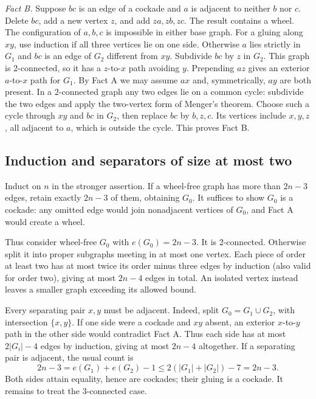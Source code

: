 \emph{Fact B.} Suppose \(bc\) is an edge of a cockade and \(a\) is adjacent to neither \(b\) nor \(c\).
Delete \(bc\), add a new vertex \(z\), and add \(za,zb,zc\). The result contains a wheel.
The configuration of \(a,b,c\) is impossible in either base graph.
For a gluing along \(xy\), use induction if all three vertices lie on one side.
Otherwise \(a\) lies strictly in \(G_1\) and \(bc\) is an edge of \(G_2\) different from \(xy\).
Subdivide \(bc\) by \(z\) in \(G_2\). This graph is 2-connected, so it has a \(z\)-to-\(x\) path avoiding \(y\).
Prepending \(az\) gives an exterior \(a\)-to-\(x\) path for \(G_1\).
By Fact A we may assume \(ax\) and, symmetrically, \(ay\) are both present.
In a 2-connected graph any two edges lie on a common cycle: subdivide the two edges and apply the two-vertex form of Menger's theorem.
Choose such a cycle through \(xy\) and \(bc\) in \(G_2\), then replace \(bc\) by \(b,z,c\).
Its vertices include \(x,y,z\), all adjacent to \(a\), which is outside the cycle. This proves Fact B.

\subsection*{Induction and separators of size at most two}
Induct on \(n\) in the stronger assertion.
If a wheel-free graph has more than \(2n-3\) edges, retain exactly \(2n-3\) of them, obtaining \(G_0\).
It suffices to show \(G_0\) is a cockade: any omitted edge would join nonadjacent vertices of \(G_0\), and Fact A would create a wheel.

Thus consider wheel-free \(G_0\) with \(e(G_0)=2n-3\).
It is 2-connected. Otherwise split it into proper subgraphs meeting in at most one vertex. Each piece of order at least two has at most twice its order minus three edges by induction (also valid for order two), giving at most \(2n-4\) edges in total. An isolated vertex instead leaves a smaller graph exceeding its allowed bound.

Every separating pair \(x,y\) must be adjacent.
Indeed, split \(G_0=G_1\cup G_2\), with intersection \(\{x,y\}\).
If one side were a cockade and \(xy\) absent, an exterior \(x\)-to-\(y\) path in the other side would contradict Fact A.
Thus each side has at most \(2|G_i|-4\) edges by induction, giving at most \(2n-4\) altogether.
If a separating pair is adjacent, the usual count is
\[
 2n-3=e(G_1)+e(G_2)-1
 \leq2(|G_1|+|G_2|)-7=2n-3.
\]
Both sides attain equality, hence are cockades; their gluing is a cockade.
It remains to treat the 3-connected case.

